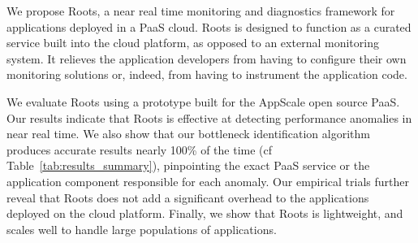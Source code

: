 We propose Roots, a near real time monitoring and diagnostics
framework for applications deployed in a PaaS cloud. 
Roots is designed to function as a curated service
built into the cloud platform, as opposed to an external monitoring system. 
It relieves the application developers from having to configure
their own monitoring solutions or, indeed,
from having to instrument the application code.


We evaluate Roots using a prototype built for the AppScale open source PaaS. 
Our results indicate that Roots is effective at detecting performance anomalies
in near real time. We also show that our bottleneck identification algorithm
produces accurate results nearly 100\% of the time (cf
Table~\ref{tab:results_summary}), pinpointing the exact PaaS
service or the application component responsible for each anomaly. Our empirical trials further 
reveal that Roots does not add a significant overhead to the applications deployed
on the cloud platform. Finally, we show that Roots is lightweight, 
and scales well to handle large populations of applications. 

